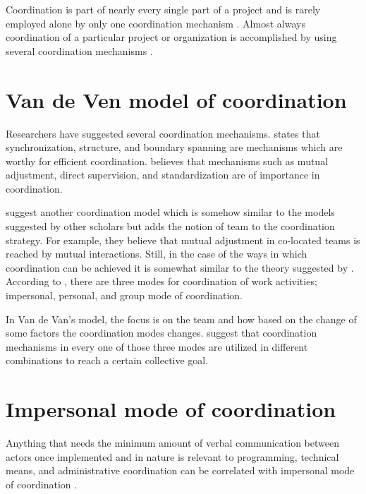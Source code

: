 Coordination is part of nearly every single part of a project and is rarely employed alone by only one coordination mechanism \citep{Osifo2012}. Almost always coordination of a particular project or organization is accomplished by using several coordination mechanisms \citep{Dietrich2013}.

\section{Van de Ven model of coordination}

Researchers have suggested several coordination mechanisms. \citet{Strode2012} states that synchronization, structure, and boundary spanning are mechanisms which are worthy for efficient coordination. \citet{Mintzberg1980} believes that mechanisms such as mutual adjustment, direct supervision, and standardization are of importance in coordination.

\citet{VanDeVen1976} suggest another coordination model which is somehow similar to the models suggested by other scholars but adds the notion of team to the coordination strategy. For example, they believe that mutual adjustment in co-located teams is reached by mutual interactions.
Still, in the case of the ways in which coordination can be achieved it is somewhat similar to the theory suggested by  \citet{Thompson2014}. According to \citet{VanDeVen1976}, there are three modes for coordination of work activities; impersonal, personal, and group mode of coordination.

In Van de Van's model, the focus is on the team and how based on the change of some factors the coordination modes changes. \citet{VanDeVen1976} suggest that coordination mechanisms in every one of those three modes are utilized in different combinations to reach a certain collective goal.

\section{Impersonal mode of coordination}

Anything that needs the minimum amount of verbal communication between actors once implemented and in nature is relevant to programming, technical means, and administrative coordination can be correlated with impersonal mode of coordination \citep{Boos2011,VanDeVen1976}.

